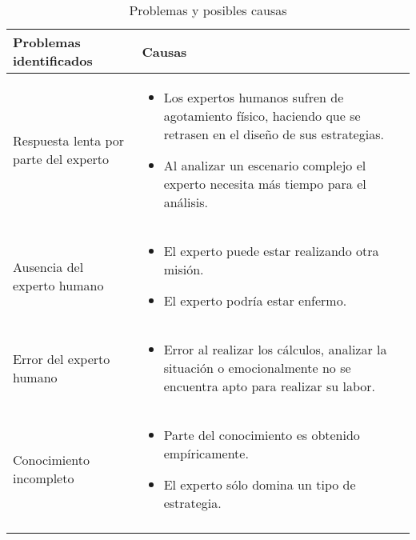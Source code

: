 \begin{longtable}[H]{p{}|p{}}
  \textbf{Problemas identificados} &  \textbf{Causas}\\\toprule
  \endhead


  Respuesta lenta por parte del experto &
  \begin{minipage}{.53\textwidth}
    \begin{itemize}
    \item Los expertos humanos sufren de agotamiento físico, haciendo que se retrasen en el diseño de sus estrategias.
    \item Al analizar un escenario complejo el experto necesita más tiempo para el análisis.
    \end{itemize}
  \end{minipage}
  \\\midrule


  Ausencia del experto humano &
  \begin{minipage}{.53\textwidth}
    \begin{itemize}
    \item El experto puede estar realizando otra misión.
    \item El experto podría estar enfermo.
    \end{itemize}
  \end{minipage}
  \\\midrule


  Error del experto humano &
  \begin{minipage}{.53\textwidth}
    \begin{itemize}
    \item Error al realizar los cálculos, analizar la situación o emocionalmente no se encuentra apto para realizar su labor.
    \end{itemize}
  \end{minipage}
  \\\midrule


  Conocimiento incompleto &
  \begin{minipage}{.53\textwidth}
    \begin{itemize}
    \item Parte del conocimiento es obtenido empíricamente.
    \item El experto sólo domina un tipo de estrategia.
    \end{itemize}
  \end{minipage}
  \\\bottomrule
  \caption{Problemas y posibles causas}
  \label{cuadro:problemasyposiblescausas}
\end{longtable}


